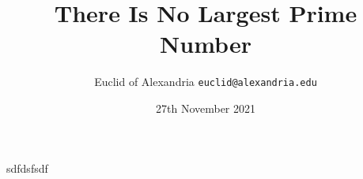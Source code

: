 \documentclass{beamer}
\title{There Is No Largest Prime Number}
\date{27th November 2021}
\author[Euclid]{Euclid of Alexandria \texttt{euclid@alexandria.edu}}
\begin{document}
\begin{frame}
\titlepage
\end{frame}

\begin{frame}
sdfdsfsdf
\end{frame}
\end{document}
